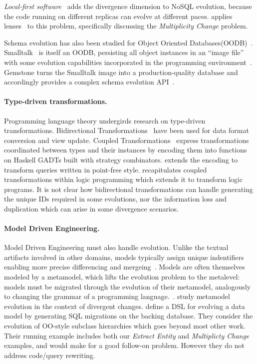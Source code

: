 \documentclass[english,submission]{programming}
\begin{document}
\emph{Local-first software}~\cite{localfirst} adds the divergence dimension to NoSQL evolution, because the code running on different replicas can evolve at different paces. \citet{Cambria} applies lenses~\cite{Foster2007} to this problem, specifically discussing the \emph{Multiplicity Change} problem.

Schema evolution has also been studied for Object Oriented Databases(OODB)~\cite{li99,banerjee87}. Smalltalk~\cite{Goldberg80} is itself an OODB, persisting all object instances in an ``image file'' with some evolution capabilities incorporated in the programming environment~\cite[pp.252-272]{Goldberg80}. Gemstone turns the Smalltalk image into a production-quality database and accordingly provides a complex schema evolution API~\cite{Gemstone}.

\paragraph{Type-driven transformations.}
Programming language theory undergirds research on type-driven transformations. Bidirectional Transformations~\cite{czarnecki2009bidirectional} have been used for data format conversion and view update.
Coupled Transformations~\cite{Berdaguer07, alcino06, Cleve2006} express transformations coordinated between types and their instances by encoding them into functions on Haskell GADTs built with strategy combinators. \citet{JVisser08} extends the encoding to transform queries written in point-free style. \citet{lammel16} recapitulates coupled transformations within logic programming which extends it to transform logic programs. It is not clear how bidirectional transformations can handle generating the unique IDs required in some evolutions, nor the information loss and duplication which can arise in some divergence scenarios.

\paragraph{Model Driven Engineering.}
Model Driven Engineering must also handle evolution. Unlike the textual artifacts involved in other domains, models typically assign unique indentifiers enabling more precise differencing and mergeing~\cite{alanen2003}.
Models are often themselves modeled by a metamodel, which lifts the evolution problem to the metalevel: models must be migrated through the evolution of their metamodel, analogously to changing the grammar of a programming language.~\cite{Herrmannsdoerfer11}. \citet{Cicchetti11} study metamodel evolution in the context of divergent changes.
\citet{vermolen11} define a DSL for evolving a data model by generating SQL migrations on the backing database. They consider the evolution of OO-style subclass hierarchies which goes beyond most other work. Their running example includes both our \emph{Extract Entity} and \emph{Multiplicty Change} examples, and would make for a good follow-on problem. However they do not address code/query rewriting.
\end{document}
